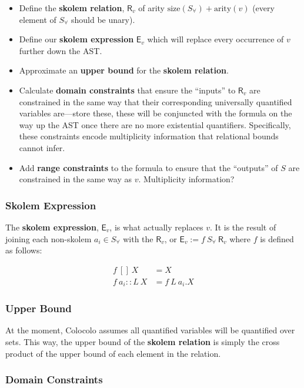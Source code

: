 \documentclass{article}
\theoremstyle{definition}
\begin{document}
    \begin{itemize}
        \item Define the \textbf{skolem relation}, $\textsf{R}_v$ of arity $\text{size}(S_\forall) + \text{arity}(v)$ (every element of $S_\forall$ should be unary).
        \item Define our \textbf{skolem expression} $\textsf{E}_v$ which will replace every occurrence of $v$ further down the AST.
        \item Approximate an \textbf{upper bound} for the \textbf{skolem relation}.
        \item Calculate \textbf{domain constraints} that ensure the ``inputs'' to $\textsf{R}_v$ are constrained in the same way that their corresponding universally quantified variables are---store these, these will be conjuncted with the formula on the way up the AST once there are no more existential quantifiers. Specifically, these constraints encode multiplicity information that relational bounds cannot infer.
        \item Add \textbf{range constraints} to the formula to ensure that the ``outputs'' of $S$ are constrained in the same way as $v$. Multiplicity information?
    \end{itemize}

    \subsubsection*{Skolem Expression}

    The \textbf{skolem expression}, $\textsf{E}_v$, is what actually replaces $v$. It is the result of joining each non-skolem $a_i \in S_\forall$ with the $\textsf{R}_v$, or $\textsf{E}_v := f~S_\forall~\textsf{R}_v$ where $f$ is defined as follows:
    
    \begin{align*}
        f~[]~X& = X\\
        f~a_i::L~X& = f~L~a_i.X
    \end{align*}

    \subsubsection*{Upper Bound}
    At the moment, Colocolo assumes all quantified variables will be quantified over sets. This way, the upper bound of the \textbf{skolem relation} is simply the cross product of the upper bound of each element in the relation.

    \subsubsection*{Domain Constraints}
\end{document}
